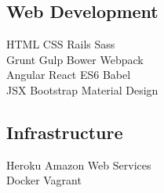 \documentclass[]{deedy-resume-openfont}
\begin{document}
\begin{minipage}[t]{0.33\textwidth}
\subsection{Web Development}
HTML \textbullet{} CSS \textbullet{} Rails \textbullet{} Sass \\
Grunt \textbullet{} Gulp \textbullet{} Bower \textbullet{} Webpack \\
Angular \textbullet{} React \textbullet{} ES6 \textbullet{} Babel \\
JSX \textbullet{} Bootstrap \textbullet{} Material Design \\
\sectionsep
\subsection{Infrastructure}
Heroku \textbullet{} Amazon Web Services \\
Docker \textbullet{} Vagrant \\

%
%

\end{minipage}
\hfill
\end{document}

